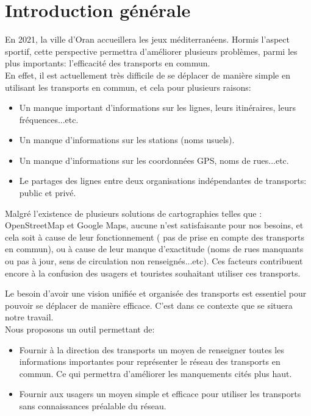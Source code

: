 \renewcommand\labelitemi{-}
\renewcommand\labelitemii{$\circ$}
\chapter{Introduction générale}

En 2021, la ville d'Oran accueillera les jeux méditerranéens. Hormis l'aspect sportif, cette perspective permettra d'améliorer plusieurs problèmes, parmi les plus importants: l'efficacité des transports en commun.\\
En effet, il est actuellement très difficile de se déplacer de manière simple en utilisant les transports en commun, et cela pour plusieurs raisons:
\begin{itemize}
	\item Un manque important d'informations sur les lignes, leurs itinéraires, leurs fréquences...etc.
	\item Un manque d'informations sur les stations (noms usuels).
	\item Un manque d'informations sur les coordonnées GPS, noms de rues...etc.
	\item Le partages des lignes entre deux organisations indépendantes de transports: public et privé.
\end{itemize}
Malgré l'existence de plusieurs solutions de cartographies telles que : OpenStreetMap et Google Maps, aucune n'est satisfaisante pour nos besoins, et cela soit à cause de leur fonctionnement ( pas de prise en compte des transports en commun), ou à cause de leur manque d'exactitude (noms de rues manquants ou pas à jour, sens de circulation non renseignés...etc). Ces facteurs contribuent encore à la confusion des usagers et touristes souhaitant utiliser ces transports.

Le besoin d'avoir une vision unifiée et organisée des transports est essentiel pour pouvoir se déplacer de manière efficace. C'est dans ce contexte que se situera notre travail.\\
Nous proposons un outil permettant de:
\begin{itemize}
	\item Fournir à la direction des transports un moyen de renseigner toutes les informations importantes pour représenter le réseau des transports en commun.\newline
	Ce qui permettra d'améliorer les manquements cités plus haut.
	\item Fournir aux usagers un moyen simple et efficace pour utiliser les transports sans connaissances préalable du réseau.
\end{itemize}

